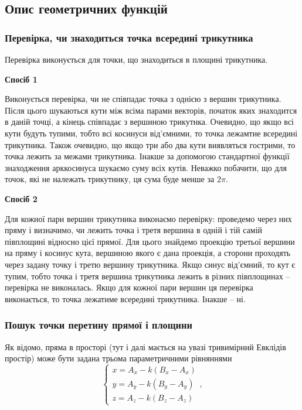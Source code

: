 \documentclass[a4paper,12pt]{article}
\begin{document}
\subsection{Опис геометричних функцій}
\subsubsection{Перевірка, чи знаходиться точка всередині трикутника}
Перевірка виконується для точки, що знаходиться в площині трикутника.

\textbf{Спосіб 1}

 Виконується перевірка, чи не співпадає точка з однією з вершин трикутника. Після цього шукаються кути між всіма парами векторів, початок яких знаходится в даній точці, а кінець співпадає з вершиною трикутнка. Очевидно, що якщо всі кути будуть тупими, тобто всі косинуси від’ємними, то точка лежамтие всередині трикутника. Також очевидно, що якщо три або два кути виявляться гострими, то точка лежить за межами трикутника. Інакше за допомогою стандартної функції знаходження арккосинуса шукаємо суму всіх кутів. Неважко побачити, що для точок, які не належать трикутнику, ця сума буде менше за $2\pi$.

\textbf{Спосіб 2}

 Для кожної пари вершин трикутника виконаємо перевірку: проведемо через них пряму і визначимо, чи лежить точка і третя вершина в одній і тій самій півплощині відносно цієї прямої. Для цього знайдемо проекцію третьої вершини на пряму і косинус кута, вершиною якого є дана проекція, а сторони проходять через задану точку і третю вершину трикутника. Якщо синус від’ємний, то кут є тупим, тобто точка і третя вершина трикутника лежить в різних півплощинах -- перевірка не виконалась. Якщо для кожної пари вершин ця перевірка виконається, то точка лежатиме всередині трикутника. Інакше -- ні.

\subsubsection{Пошук точки перетину прямої і площини} \label{sec:intersections}
Як відомо, пряма в просторі (тут і далі мається на увазі тривимірний Евклідів простір) може бути задана трьома параметричними рівняннями
\begin{equation} \label{eq:line}
  \begin{cases}
    x = A_x - k(B_x - A_x) \\
    y = A_y - k(B_y - A_y) \\
    z = A_z - k(B_z - A_z)
  \end{cases},
\end{equation}
\end{document}
